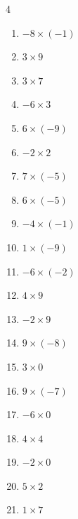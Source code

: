 \begin{multicols}{4}
\begin{enumerate}
  \item $-8\times (-1)$
        \phantom{$=8$}

  \item $3\times 9$
        \phantom{$=27$}

  \item $3\times 7$
        \phantom{$=21$}

  \item $-6\times 3$
        \phantom{$=-18$}

  \item $6\times (-9)$
        \phantom{$=-54$}

  \item $-2\times 2$
        \phantom{$=-4$}

  \item $7\times (-5)$
        \phantom{$=-35$}

  \item $6\times (-5)$
        \phantom{$=-30$}

  \item $-4\times (-1)$
        \phantom{$=4$}

  \item $1\times (-9)$
        \phantom{$=-9$}

  \item $-6\times (-2)$
        \phantom{$=12$}

  \item $4\times 9$
        \phantom{$=36$}

\columnbreak %

  \item $-2\times 9$
        \phantom{$=-18$}

  \item $9\times (-8)$
        \phantom{$=-72$}

  \item $3\times 0$
        \phantom{$=0$}

  \item $9\times (-7)$
        \phantom{$=-63$}

  \item $-6\times 0$
        \phantom{$=0$}

  \item $4\times 4$
        \phantom{$=16$}

  \item $-2\times 0$
        \phantom{$=0$}

  \item $5\times 2$
        \phantom{$=10$}

  \item $1\times 7$
        \phantom{$=7$}


\end{enumerate}
\end{multicols}
